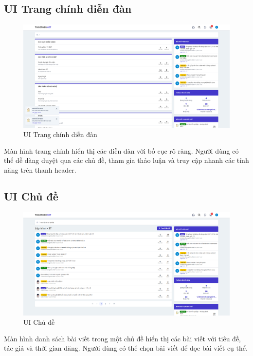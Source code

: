 \documentclass[../index.tex]{subfiles}
\begin{document}
    \subsection{UI Trang chính diễn đàn}
    \begin{figure}[H]
        \centering
        \includegraphics[width=1\linewidth]{figures/demo/home-page}
        \caption{UI Trang chính diễn đàn}
    \end{figure}
    Màn hình trang chính hiển thị các diễn đàn với bố cục rõ ràng. Người dùng có
    thể dễ dàng duyệt qua các chủ đề, tham gia thảo luận và truy cập nhanh các
    tính năng trên thanh header.

    \subsection{UI Chủ đề}
    \begin{figure}[H]
        \centering
        \includegraphics[width=1\linewidth]{figures/demo/topic-page.png}
        \caption{UI Chủ đề}
    \end{figure}
    Màn hình danh sách bài viết trong một chủ đề hiển thị các bài viết với tiêu
    đề, tác giả và thời gian đăng. Người dùng có thể chọn bài viết để đọc bài
    viết cụ thể.
\end{document}
